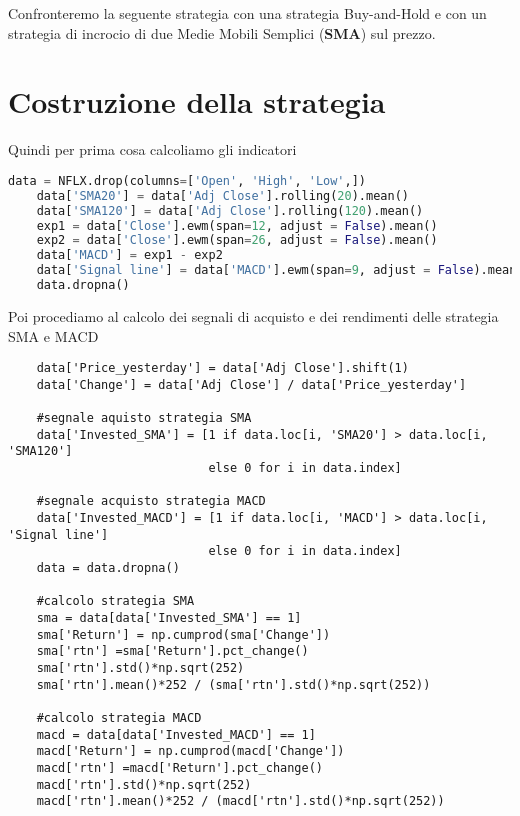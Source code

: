 \documentclass{report}
\begin{document}
Confronteremo la seguente strategia con una strategia Buy-and-Hold e con un strategia di incrocio di due Medie Mobili Semplici (\textbf{SMA}) sul prezzo. 
\section{Costruzione della strategia}
Quindi per prima cosa calcoliamo gli indicatori
\begin{lstlisting}[language=python]
    data = NFLX.drop(columns=['Open', 'High', 'Low',])
    data['SMA20'] = data['Adj Close'].rolling(20).mean()
    data['SMA120'] = data['Adj Close'].rolling(120).mean()
    exp1 = data['Close'].ewm(span=12, adjust = False).mean()
    exp2 = data['Close'].ewm(span=26, adjust = False).mean()
    data['MACD'] = exp1 - exp2
    data['Signal line'] = data['MACD'].ewm(span=9, adjust = False).mean()
    data.dropna()
\end{lstlisting}
Poi procediamo al calcolo dei segnali di acquisto e dei rendimenti delle strategia SMA e MACD
\begin{lstlisting}
    data['Price_yesterday'] = data['Adj Close'].shift(1)
    data['Change'] = data['Adj Close'] / data['Price_yesterday']
    
    #segnale aquisto strategia SMA
    data['Invested_SMA'] = [1 if data.loc[i, 'SMA20'] > data.loc[i, 'SMA120'] 
                            else 0 for i in data.index]
    
    #segnale acquisto strategia MACD
    data['Invested_MACD'] = [1 if data.loc[i, 'MACD'] > data.loc[i, 'Signal line']
                            else 0 for i in data.index]
    data = data.dropna()
    
    #calcolo strategia SMA
    sma = data[data['Invested_SMA'] == 1]
    sma['Return'] = np.cumprod(sma['Change'])
    sma['rtn'] =sma['Return'].pct_change()
    sma['rtn'].std()*np.sqrt(252)
    sma['rtn'].mean()*252 / (sma['rtn'].std()*np.sqrt(252))
    
    #calcolo strategia MACD
    macd = data[data['Invested_MACD'] == 1]
    macd['Return'] = np.cumprod(macd['Change'])
    macd['rtn'] =macd['Return'].pct_change()
    macd['rtn'].std()*np.sqrt(252)
    macd['rtn'].mean()*252 / (macd['rtn'].std()*np.sqrt(252))
\end{lstlisting}
\end{document}
